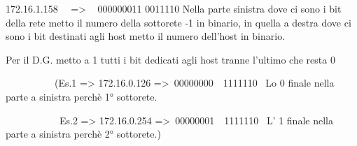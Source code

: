 \documentclass[
]{article}
\begin{document}
{172.16.}{1}{.}{158}{~ ~=\textgreater{} ~ }{00000001}{1 }{\textbar{}
}{0011110 }{Nella parte sinistra dove ci sono i bit della rete metto il
numero della sottorete -1 in binario, in quella a destra dove ci sono i
bit destinati agli host metto il numero dell'host in binario.}

{}

{Per il D.G. metto a 1 tutti i bit dedicati agli host tranne l'ultimo
che resta 0}

{~ ~ ~ ~ ~ ~ (Es.1 =\textgreater{} 172.16.}{0}{.}{126
}{=\textgreater{}}{~}{0000000}{0}{~}{\textbar{}}{~}{1111110 ~}{Lo 0
finale nella parte a sinistra perchè 1° sottorete. ~ ~ ~ ~ ~ ~ ~ ~}

{~ ~ ~ ~ ~ ~ ~}{Es.2 =\textgreater{} 172.16.}{0}{.}{254
}{=\textgreater{}}{~}{0000000}{1}{~}{\textbar{}}{~}{1111110 ~}{L' 1
finale nella parte a sinistra perchè 2° sottorete.)}

{}
\end{document}
